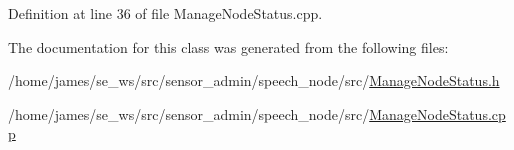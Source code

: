 Definition at line 36 of file Manage\-Node\-Status.\-cpp.



The documentation for this class was generated from the following files\-:\begin{DoxyCompactItemize}
\item 
/home/james/se\-\_\-ws/src/sensor\-\_\-admin/speech\-\_\-node/src/\hyperlink{_manage_node_status_8h}{Manage\-Node\-Status.\-h}\item 
/home/james/se\-\_\-ws/src/sensor\-\_\-admin/speech\-\_\-node/src/\hyperlink{_manage_node_status_8cpp}{Manage\-Node\-Status.\-cpp}\end{DoxyCompactItemize}
